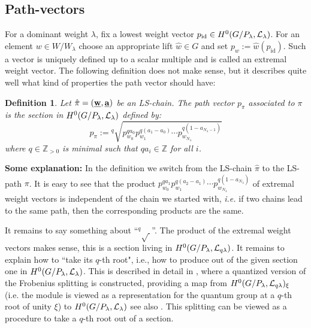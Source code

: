 \documentclass{emsprocart}
\theoremstyle{definition}
\newtheorem{definition}[theorem]{Definition}
\begin{document}
\subsection{Path-vectors} For a dominant weight $\lambda$, fix a lowest weight vector $p_{\text{id}}\in H^0(G/P_\lambda,\cal L_{\lambda})$.
For an element $w\in W/W_\lambda$ choose an appropriate lift $\hat w\in G$ and set $p_w:= \hat w(p_{\text{id}})$. Such a vector is uniquely defined up to a
scalar multiple and is called an extremal weight vector.
The following definition
does not make sense, but it describes quite well what kind of properties the path vector should have:
\begin{definition}\label{pathvector}\it
Let $\hat\pi=(\underline{\bf w},\underline{\bf a})$ be an LS-chain. The path vector $p_\pi$ associated to $\pi$ is the section
in $H^0(G/P_\lambda,\cal L_{\lambda})$ defined by:
$$
p_\pi:={}^q\sqrt{p_{w_0}^{qa_0} p_{w_1}^{q(a_1-a_0)}\cdots p_{w_{N_\lambda}}^{q(1-a_{N_\lambda-1})}}
$$
 where $q\in \mathbb Z_{>0}$ is minimal such that $q a_i\in\mathbb Z$ for all $i$.
\end{definition}
{\bf Some explanation:} In the definition we switch from the LS-chain $\hat \pi$ to the LS-path $\pi$. It is easy to see that the product
$p_{w_0}^{qa_1} p_{w_1}^{q(a_2-a_1)}\cdots p_{w_{N_\lambda}}^{q(1-a_{N_\lambda})}$ of extremal weight vectors is independent
of the chain we started with, \emph{i.e.} if two chains lead to the same path, then the corresponding products
are the same.

It remains to say something about ``${}^q\sqrt{\ }$''.
The product of the extremal weight vectors makes sense,
this is a section living in $H^0(G/P_\lambda,{\cal L}_{q\lambda})$. It remains to explain how to ``take its $q$-th root", i.e., how
to produce out of the given section one in $H^0(G/P_\lambda,\cal L_{\lambda})$.
This is described in detail in \cite{L2}, where a quantized version of the Frobenius splitting is constructed,
providing a map from $H^0(G/P_\lambda,{\cal L}_{q\lambda})_\xi$ (i.e. the module is viewed as a representation for the quantum group at a
$q$-th root of unity $\xi$) to $H^0(G/P_\lambda,{\cal L}_{\lambda})$
see also \cite{KuL}. This splitting can be viewed as a procedure to take a $q$-th root out of a section.
\end{document}
